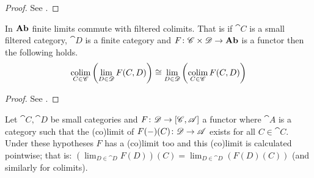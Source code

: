 \begin{proof}
  See \cite[Proposition 2.12.1]{handbook1}.
\end{proof}

\begin{proposition}
  \label{prop:limits_and_filtered_colimits}
  In \(\text{\normalfont\textbf{Ab}}\) finite limits commute with filtered colimits. That is if \(\cat{C}\) is a small filtered category, \(\cat{D}\) is a finite category and \(F\colon {\mathscr C}\times{\mathscr D}\to \text{\normalfont\textbf{Ab}}\) is a functor then the following holds.
  \begin{equation*}
    \operatorname*{colim}_{C\in{\mathscr C}}\left(\lim_{D\in{\mathscr D}}F(C,D)\right) \cong \lim_{D\in{\mathscr D}}\left(\operatorname*{colim}_{C\in{\mathscr C}}F(C,D)\right)
  \end{equation*}
\end{proposition}

\begin{proof}
  See \cite[Theorem 2.13.4]{handbook1}.
\end{proof}

\begin{proposition}
  \label{prop:pointwise_limits}
  Let \(\cat{C},\cat{D}\) be small categories and \(F\colon {\mathscr D}\to [{\mathscr C},{\mathscr A}]\) a functor where \(\cat{A}\) is a category such that the (co)limit of \(F(-)(C)\colon {\mathscr D}\to {\mathscr A}\) exists for all \(C\in\cat{C}\). Under these hypotheses \(F\) has a (co)limit too and this (co)limit is calculated pointwise; that is: \((\lim_{D\in\cat{D}}F(D))(C) = \lim_{D\in\cat{D}}(F(D)(C))\) (and similarly for colimits).
\end{proposition}

